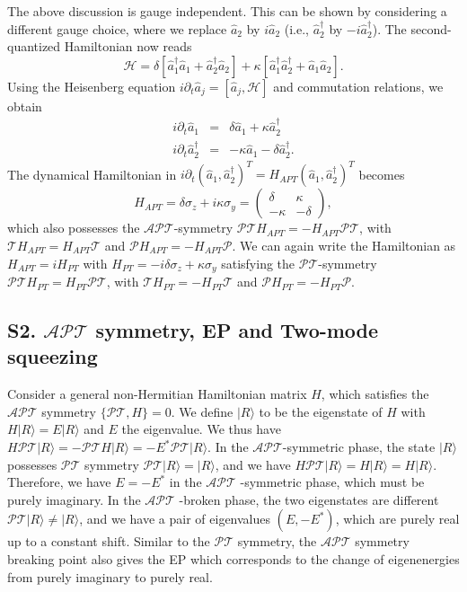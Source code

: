 \documentclass[twocolumn,prl,floatfix,citeautoscript,nofootinbib,superscriptaddress]{revtex4}
\begin{document}
\begin{widetext}
The above discussion is gauge independent. This can be shown by considering
a different gauge choice, where we replace $\hat{a}_{2}$ by $i\hat{a}_{2}$
(i.e., $\hat{a}_{2}^{\dag }$ by $-i\hat{a}_{2}^{\dag }$). The
second-quantized Hamiltonian now reads
\begin{equation}
\mathcal{H}=\delta \left[ \hat{a}_{1}^{\dag }\hat{a}_{1}+\hat{a}_{2}^{\dag }%
\hat{a}_{2}\right] +\kappa \left[ \hat{a}_{1}^{\dag }\hat{a}_{2}^{\dag }+%
\hat{a}_{1}\hat{a}_{2}\right] .
\end{equation}%
Using the Heisenberg equation $i\partial _{t}\hat{a}_{j}=[\hat{a}_{j},%
\mathcal{H}]$ and commutation relations, we obtain%
\begin{eqnarray}
i\partial _{t}\hat{a}_{1} &=&\delta \hat{a}_{1}+\kappa \hat{a}_{2}^{\dag }
\nonumber \\
i\partial _{t}\hat{a}_{2}^{\dag } &=&-\kappa \hat{a}_{1}-\delta \hat{a}%
_{2}^{\dag }.
\end{eqnarray}%
The dynamical Hamiltonian in $i\partial _{t}(\hat{a}_{1},\hat{a}_{2}^{\dag
})^{T}=H_{APT}(\hat{a}_{1},\hat{a}_{2}^{\dag })^{T}$ becomes
\begin{equation}
H_{APT}=\delta \sigma _{z}+i\kappa \sigma _{y}=\left(
\begin{array}{cc}
\delta & \kappa \\
-\kappa & -\delta%
\end{array}%
\right) ,
\end{equation}%
which also possesses the $\mathcal{APT}$-symmetry $\mathcal{PT}%
H_{APT}=-H_{APT}\mathcal{PT}$, with $\mathcal{T}H_{APT}=H_{APT}\mathcal{T}$
and $\mathcal{P}H_{APT}=-H_{APT}\mathcal{P}$. We can again write the
Hamiltonian as $H_{APT}=iH_{PT}$ with $H_{PT}=-i\delta \sigma _{z}+\kappa
\sigma _{y}$ satisfying the $\mathcal{PT}$-symmetry $\mathcal{PT}%
H_{PT}=H_{PT}\mathcal{PT}$, with $\mathcal{T}H_{PT}=-H_{PT}\mathcal{T}$ and $%
\mathcal{P}H_{PT}=-H_{PT}\mathcal{P}$.

\subsection{S2. $\mathcal{APT}$ symmetry, EP and Two-mode squeezing}

Consider a general non-Hermitian Hamiltonian matrix $H$, which satisfies the
$\mathcal{APT}$ symmetry $\{\mathcal{PT},H\}=0$. We define $|R\rangle $ to
be the eigenstate of $H$ with $H|R\rangle =E|R\rangle $ and $E$ the
eigenvalue. We thus have $H\mathcal{PT}|R\rangle =-\mathcal{PT}H|R\rangle
=-E^{\ast }\mathcal{PT}|R\rangle $. In the $\mathcal{APT}$-symmetric phase,
the state $|R\rangle $ possesses $\mathcal{PT}$ symmetry $\mathcal{PT}%
|R\rangle =|R\rangle $, and we have $H\mathcal{PT}|R\rangle =H|R\rangle
=H|R\rangle $. Therefore, we have $E=-E^{\ast }$ in the $\mathcal{APT}$%
-symmetric phase, which must be purely imaginary. In the $\mathcal{APT}$%
-broken phase, the two eigenstates are different $\mathcal{PT}|R\rangle \neq
|R\rangle $, and we have a pair of eigenvalues $(E,-E^{\ast })$, which are
purely real up to a constant shift. Similar to the $\mathcal{PT}$ symmetry,
the $\mathcal{APT}$ symmetry breaking point also gives the EP which
corresponds to the change of eigenenergies from purely imaginary to purely
real.


\end{widetext}
\end{document}
